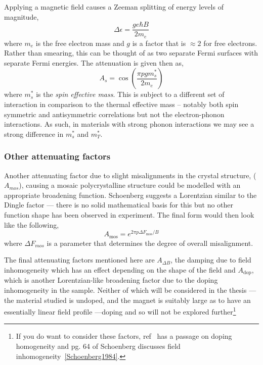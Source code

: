 Applying a magnetic field causes a Zeeman splitting of energy levels of magnitude,
\begin{equation}
  \Delta\epsilon = \frac{g e \hbar B}{2 m_e}
\end{equation}
where $m_e$ is the free electron mass and $g$ is a factor that is $\approx2$ for free electrons. Rather than smearing, this can be thought of as two separate Fermi surfaces with separate Fermi energies. The attenuation is given then as,
\begin{equation}
  A_s = \cos\left(\frac{\pi p g m^*_s}{2m_e}\right)
\end{equation}
where $m^*_s$ is the \textit{spin effective mass}. This is subject to a different set of interaction in comparison to the thermal effective mass -- notably both spin symmetric and antisymmetric correlations but not the electron-phonon interactions. As such, in materials with strong phonon interactions we may see a strong difference in $m^*_s$ and $m^*_T$.

\subsubsection{Other attenuating factors}

Another attenuating factor due to slight misalignments in the crystal structure, ($A_{mos}$), causing a mosaic polycrystalline structure could be modelled with an appropriate broadening function. Schoenberg suggests a Lorentzian similar to the Dingle factor --- there is no solid mathematical basis for this but no other function shape has been observed in experiment. The final form would then look like the following,
\begin{equation}
  A_{\textrm{mos}} = e^{2\pi p \Delta F_{\textrm{mos}}/B}
\end{equation}
where $\Delta F_{mos}$ is a parameter that determines the degree of overall misalignment.

The final attenuating factors mentioned here are $A_{\Delta B}$, the damping due to field inhomogeneity which has an effect depending on the shape of the field and $A_{\textrm{dop}}$, which is another Lorentzian-like broadening factor due to the doping inhomogeneity in the sample. Neither of which will be considered in the thesis --- the material studied is undoped, and the magnet is suitably large as to have an essentially linear field profile ---doping and so will not be explored further\footnote{If you do want to consider these factors, ref~\cite{Rourke2010b} has a passage on doping homogeneity and pg. 64 of Schoenberg discusses field inhomogeneity~\ref{Schoenberg1984}.}

